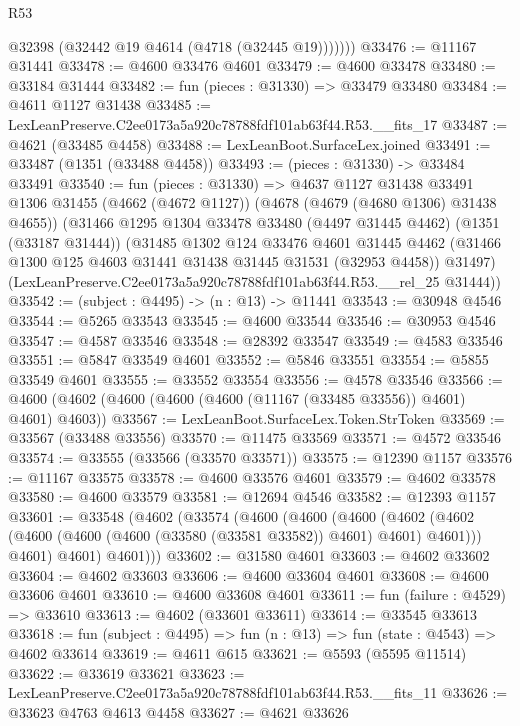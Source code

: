 \begin{lexlean}{R53}
\begin{coremodule}
            @32398
            (@32442 @19 @4614 (@4718 (@32445 @19)))))))
@33476 := @11167 @31441
@33478 := @4600 @33476 @4601
@33479 := @4600 @33478
@33480 := @33184 @31444
@33482 := fun (pieces : @31330) => @33479 @33480
@33484 := @4611 @1127 @31438
@33485 := LexLeanPreserve.C2ee0173a5a920c78788fdf101ab63f44.R53.__fits_17
@33487 := @4621 (@33485 @4458)
@33488 := LexLeanBoot.SurfaceLex.joined
@33491 := @33487 (@1351 (@33488 @4458))
@33493 := (pieces : @31330) -> @33484 @33491
@33540 := fun (pieces : @31330) =>
  @4637
    @1127
    @31438
    @33491
    @1306
    @31455
    (@4662 (@4672 @1127))
    (@4678 (@4679 (@4680 @1306) @31438 @4655))
    (@31466
      @1295
      @1304
      @33478
      @33480
      (@4497 @31445 @4462)
      (@1351 (@33187 @31444))
      (@31485
        @1302
        @124
        @33476
        @4601
        @31445
        @4462
        (@31466 @1300 @125 @4603 @31441 @31438 @31445 @31531 (@32953 @4458))
        @31497)
      (LexLeanPreserve.C2ee0173a5a920c78788fdf101ab63f44.R53.__rel_25 @31444))
@33542 := (subject : @4495) -> (n : @13) -> @11441
@33543 := @30948 @4546
@33544 := @5265 @33543
@33545 := @4600 @33544
@33546 := @30953 @4546
@33547 := @4587 @33546
@33548 := @28392 @33547
@33549 := @4583 @33546
@33551 := @5847 @33549 @4601
@33552 := @5846 @33551
@33554 := @5855 @33549 @4601
@33555 := @33552 @33554
@33556 := @4578 @33546
@33566 := @4600 (@4602 (@4600 (@4600 (@4600 (@11167 (@33485 @33556)) @4601) @4601) @4603))
@33567 := LexLeanBoot.SurfaceLex.Token.StrToken
@33569 := @33567 (@33488 @33556)
@33570 := @11475 @33569
@33571 := @4572 @33546
@33574 := @33555 (@33566 (@33570 @33571))
@33575 := @12390 @1157
@33576 := @11167 @33575
@33578 := @4600 @33576 @4601
@33579 := @4602 @33578
@33580 := @4600 @33579
@33581 := @12694 @4546
@33582 := @12393 @1157
@33601 := @33548
    (@4602
      (@33574
        (@4600
          (@4600
            (@4600
              (@4602 (@4602 (@4600 (@4600 (@4600 (@33580 (@33581 @33582)) @4601) @4601) @4601)))
              @4601)
            @4601)
          @4601)))
@33602 := @31580 @4601
@33603 := @4602 @33602
@33604 := @4602 @33603
@33606 := @4600 @33604 @4601
@33608 := @4600 @33606 @4601
@33610 := @4600 @33608 @4601
@33611 := fun (failure : @4529) => @33610
@33613 := @4602 (@33601 @33611)
@33614 := @33545 @33613
@33618 := fun (subject : @4495) => fun (n : @13) => fun (state : @4543) => @4602 @33614
@33619 := @4611 @615
@33621 := @5593 (@5595 @11514)
@33622 := @33619 @33621
@33623 := LexLeanPreserve.C2ee0173a5a920c78788fdf101ab63f44.R53.__fits_11
@33626 := @33623 @4763 @4613 @4458
@33627 := @4621 @33626

\end{coremodule}
\end{lexlean}
